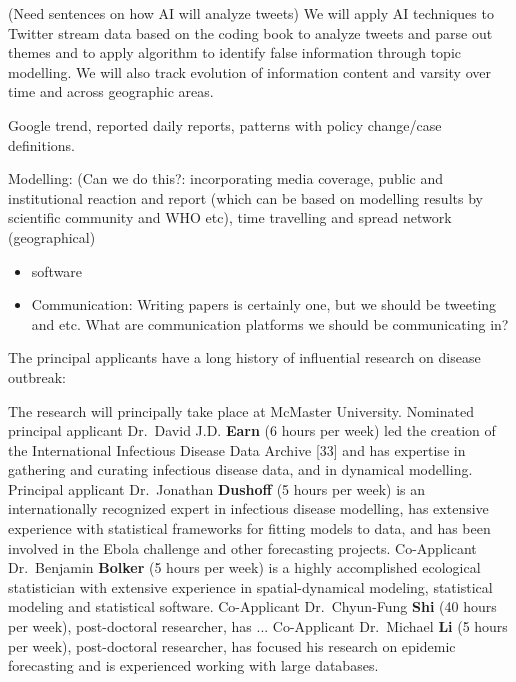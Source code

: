 	(Need sentences on how AI will analyze tweets)
We will apply AI techniques to Twitter stream data based on the coding book to analyze tweets and parse out themes and to apply algorithm to identify false information through topic modelling.  We will also track evolution of information content and varsity over time and across geographic areas.


Google trend, reported daily reports, patterns with policy change/case definitions.


Modelling: (Can we do this?: incorporating media coverage, public and institutional reaction and report (which can be based on modelling results by scientific community and WHO etc), time travelling and spread network (geographical)



\begin{itemize}
\item{software}
\item{Communication: Writing papers is certainly one, but we should be tweeting and etc. What are communication platforms we should be communicating in?}
\end{itemize}



The principal applicants have a long history of influential research on disease outbreak: 

The research will principally take place at McMaster University. 
Nominated principal applicant Dr.\ David J.D. \textbf{Earn} (6 hours per week) led the creation of the International Infectious Disease Data Archive [33] and has expertise in gathering and curating infectious disease data, and in dynamical modelling.
Principal applicant Dr.\ Jonathan \textbf{Dushoff} (5 hours per week) is an internationally recognized expert in infectious disease modelling, has extensive experience with statistical frameworks for fitting models to data, and has been involved in the Ebola challenge and other forecasting projects. 
Co-Applicant Dr.\ Benjamin \textbf{Bolker} (5 hours per week) is a highly accomplished ecological statistician with extensive experience in spatial-dynamical modeling, statistical modeling and statistical software.
Co-Applicant Dr.\ Chyun-Fung \textbf{Shi} (40 hours per week), post-doctoral researcher, has ...
Co-Applicant Dr.\ Michael \textbf{Li} (5 hours per week), post-doctoral researcher, has focused his research on epidemic forecasting and is experienced working with large databases. 

